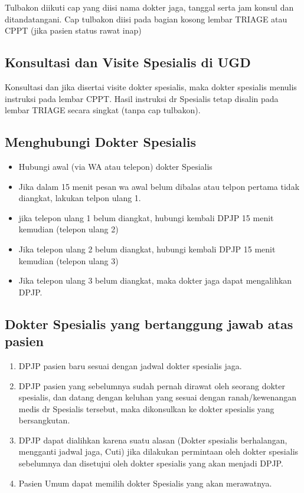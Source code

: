\documentclass[
]{book}
\providecommand{\tightlist}{%
  \setlength{\itemsep}{0pt}\setlength{\parskip}{0pt}}
\begin{document}
Tulbakon diikuti cap yang diisi nama dokter jaga, tanggal serta jam konsul dan ditandatangani.
Cap tulbakon diisi pada bagian kosong lembar TRIAGE atau CPPT (jika pasien status rawat inap)

\hypertarget{konsultasi-dan-visite-spesialis-di-ugd}{%
\subsection{Konsultasi dan Visite Spesialis di UGD}\label{konsultasi-dan-visite-spesialis-di-ugd}}

Konsultasi dan jika disertai visite dokter spesialis, maka dokter spesialis menulis instruksi pada lembar CPPT. Hasil instruksi dr Spesialis tetap disalin pada lembar TRIAGE secara singkat (tanpa cap tulbakon).

\hypertarget{menghubungi-dokter-spesialis}{%
\subsection{Menghubungi Dokter Spesialis}\label{menghubungi-dokter-spesialis}}

\begin{itemize}
\tightlist
\item
  Hubungi awal (via WA atau telepon) dokter Spesialis
\item
  Jika dalam 15 menit pesan wa awal belum dibalas atau telpon pertama tidak diangkat, lakukan telpon ulang 1.
\item
  jika telepon ulang 1 belum diangkat, hubungi kembali DPJP 15 menit kemudian (telepon ulang 2)
\item
  Jika telepon ulang 2 belum diangkat, hubungi kembali DPJP 15 menit kemudian (telepon ulang 3)
\item
  Jika telepon ulang 3 belum diangkat, maka dokter jaga dapat mengalihkan DPJP.
\end{itemize}

\hypertarget{dokter-spesialis-yang-bertanggung-jawab-atas-pasien}{%
\subsection{Dokter Spesialis yang bertanggung jawab atas pasien}\label{dokter-spesialis-yang-bertanggung-jawab-atas-pasien}}

\begin{enumerate}
\def\labelenumi{\arabic{enumi}.}
\tightlist
\item
  DPJP pasien baru sesuai dengan jadwal dokter spesialis jaga.
\item
  DPJP pasien yang sebelumnya sudah pernah dirawat oleh seorang dokter spesialis, dan datang dengan keluhan yang sesuai dengan ranah/kewenangan medis dr Spesialis tersebut, maka dikonsulkan ke dokter spesialis yang bersangkutan.
\item
  DPJP dapat dialihkan karena suatu alasan (Dokter spesialis berhalangan, mengganti jadwal jaga, Cuti) jika dilakukan permintaan oleh dokter spesialis sebelumnya dan disetujui oleh dokter spesialis yang akan menjadi DPJP.
\item
  Pasien Umum dapat memilih dokter Spesialis yang akan merawatnya.
\end{enumerate}
\end{document}

